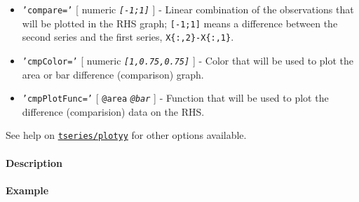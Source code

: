 \begin{itemize}
\item
  \texttt{'compare='} {[} numeric \textbar{} \emph{\texttt{{[}-1;1{]}}}
  {]} - Linear combination of the observations that will be plotted in
  the RHS graph; \texttt{{[}-1;1{]}} means a difference between the
  second series and the first series, \texttt{X\{:,2\}-X\{:,1\}}.
\item
  \texttt{'cmpColor='} {[} numeric \textbar{}
  \emph{\texttt{{[}1,0.75,0.75{]}}} {]} - Color that will be used to
  plot the area or bar difference (comparison) graph.
\item
  \texttt{'cmpPlotFunc='} {[} \texttt{@area} \textbar{}
  \emph{\texttt{@bar}} {]} - Function that will be used to plot the
  difference (comparision) data on the RHS.
\end{itemize}

See help on \href{tseries/plotyy}{\texttt{tseries/plotyy}} for other
options available.

\paragraph{Description}\label{description}

\paragraph{Example}\label{example}


